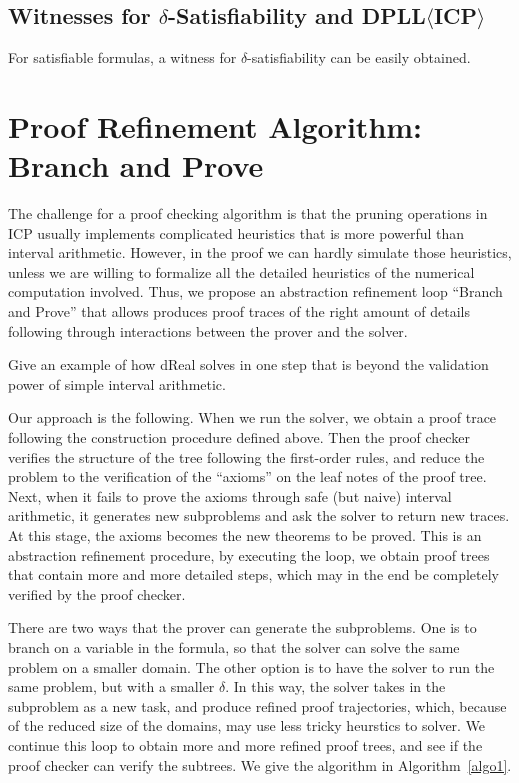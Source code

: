 \documentclass[envcountsect]{llncs}
\begin{document}
\subsection{Witnesses for $\delta$-Satisfiability and
DPLL$\langle$ICP$\rangle$}

For satisfiable formulas, a witness for $\delta$-satisfiability can be
easily obtained.


\section{Proof Refinement Algorithm: Branch and Prove}\label{bnp}

The challenge for a proof checking algorithm is that the pruning operations in
ICP usually implements complicated heuristics that is more powerful than
interval arithmetic. However, in the proof we can hardly simulate those
heuristics, unless we are willing to formalize all the detailed heuristics of
the numerical computation involved. Thus, we propose an abstraction refinement
loop ``Branch and Prove'' that allows produces proof traces of the right amount
of details following through interactions between the prover and the solver. 

\begin{example}
Give an example of how dReal solves in one step that is beyond the validation
power of simple interval arithmetic.
\end{example}

Our approach is the following. When we run the solver, we obtain a proof trace
following the construction procedure defined above. Then the proof checker
verifies the structure of the tree following the first-order rules, and reduce
the problem to the verification of the ``axioms'' on the leaf notes of the
proof tree. Next, when it fails to prove the axioms through safe (but naive)
interval arithmetic, it generates new subproblems and ask the solver to return
new traces. At this stage, the axioms becomes the new theorems to be proved.
This is an abstraction refinement procedure, by executing the loop, we obtain
proof trees that contain more and more detailed steps, which may in the end be
completely verified by the proof checker. 

There are two ways that the prover can generate the subproblems. One is to
branch on a variable in the formula, so that the solver can solve the same
problem on a smaller domain. The other option is to have the solver to run the
same problem, but with a smaller $\delta$. In this way, the solver takes in the
subproblem as a new task, and produce refined proof trajectories, which,
because of the reduced size of the domains, may use less tricky heurstics to
solver. We continue this loop to obtain more and more refined proof trees, and
see if the proof checker can verify the subtrees. We give the algorithm in
Algorithm~\ref{algo1}. 
\end{document}
